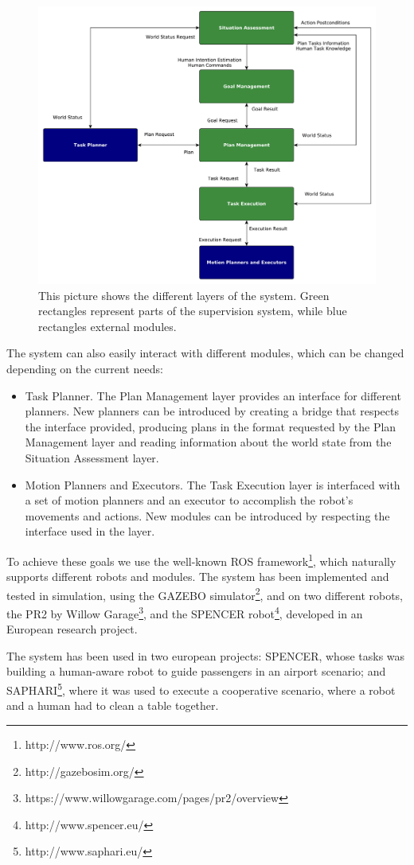  \begin{figure}[h!]
	\centering
	\includegraphics[scale=0.45]{img/intro/system_architecture.pdf}
	\caption[System architecture]{This picture shows the different layers of the system. Green rectangles represent parts of the
	supervision system, while blue rectangles external modules.}
	\label{fig:intro-system_architecture}
\end{figure}

The system can also easily interact with different modules, which can be changed depending on the current needs:
\begin{itemize}
\item Task Planner. The Plan Management layer provides an interface for different planners. New planners can be introduced by creating a bridge that respects the interface provided, producing plans in the format requested by the Plan Management layer and reading information about the world state from the Situation Assessment layer.
\item Motion Planners and Executors. The Task Execution layer is interfaced with a set of motion planners and an executor to accomplish the robot's movements and actions. New modules can be introduced by respecting the interface used in the layer.
\end{itemize}


To achieve these goals we use the well-known ROS framework\footnote{http://www.ros.org/}, which naturally supports different robots and modules. The system has been implemented and tested in simulation, using the GAZEBO simulator\footnote{http://gazebosim.org/}, and on two different robots, the PR2 by Willow Garage\footnote{https://www.willowgarage.com/pages/pr2/overview}, and the SPENCER robot\footnote{http://www.spencer.eu/}, developed in an European research project. 

The system has been used in two european projects: SPENCER, whose tasks was building a human-aware robot to guide passengers in an airport scenario; and SAPHARI\footnote{http://www.saphari.eu/}, where it was used to execute a cooperative scenario, where a robot and a human had to clean a table together.